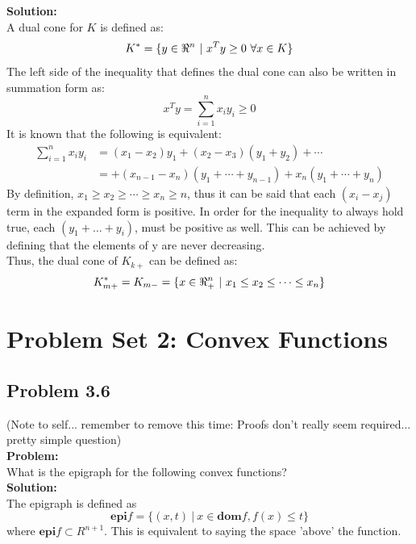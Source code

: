 \documentclass[letter]{article}
\begin{document}
\noindent
\textbf{Solution:}\\
A dual cone for $K$ is defined as:
\begin{equation}
	K^* = \{y \in \real^n \ | \ x^ Ty \geq 0 \ \forall x \in K\}
\end{equation}
The left side of the inequality that defines the dual cone can also be written in summation form as: $$x^T y = \sum_{i=1}^{n} x_i y_i \geq 0$$
It is known that the following is equivalent:
\begin{equation}
	\begin{aligned}
		\sum_{i=1}^{n} x_i y_i &= (x_1 - x_2) y_1 + (x_2 - x_3) (y_1 + y_2) + \cdots \\
						&= + (x_{n-1} - x_n) (y_1 + \cdots + y_{n-1}) + x_n (y_1 + \cdots + y_n)
	\end{aligned}
\end{equation}
By definition, $x_1 \geq x_2 \geq \cdots \geq x_n \geq n$, thus it can be said that each $(x_i - x_j)$ term in the expanded form is positive. In order for the inequality to always hold true, each $(y_1 + \dots + y_i)$, must be positive as well. This can be achieved by defining that the elements of y are never decreasing.\\
Thus, the dual cone of $K_{k+}$ can be defined as:
\begin{equation}
	K_{m+}^{*} = K_{m-} = \{x \in \real_{+}^n \ | \ x_1 \leq x_2 \leq \dots \leq x_n\} 
\end{equation}


\newpage
\section{Problem Set 2: Convex Functions}

\subsection{Problem 3.6}
(Note to self... remember to remove this time: Proofs don't really seem required... pretty simple question)\\
\textbf{Problem:}\\
What is the epigraph for the following convex functions?\\

\noindent
\textbf{Solution:}\\
The epigraph is defined as 
\begin{equation}
	\textbf{epi} f = \{(x,t) \ | \ x \in \textbf{dom} f, f(x) \leq t\}
\end{equation}
where $\textbf{epi} f \subset R^{n+1}$. This is equivalent to saying the space 'above' the function.
\end{document}
